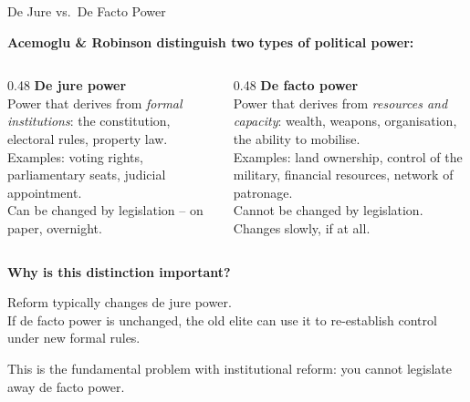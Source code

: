 \documentclass[10pt]{beamer}
\begin{document}
\begin{frame}[allowframebreaks]{De Jure vs.\ De Facto Power}

\textbf{Acemoglu \& Robinson distinguish two types of political power:}


\begin{columns}[T]
\begin{column}{0.48\textwidth}
\textbf{\color{myTeal} De jure power}\\[6pt]
Power that derives from \emph{formal institutions}: the constitution, electoral rules, property law.\\[4pt]
\footnotesize
Examples: voting rights, parliamentary seats, judicial appointment.\\[4pt]
Can be changed by legislation -- on paper, overnight.
\end{column}
\begin{column}{0.48\textwidth}
\textbf{\color{myOrange} De facto power}\\[6pt]
Power that derives from \emph{resources and capacity}: wealth, weapons, organisation, the ability to mobilise.\\[4pt]
\footnotesize
Examples: land ownership, control of the military, financial resources, network of patronage.\\[4pt]
Cannot be changed by legislation. Changes slowly, if at all.
\end{column}
\end{columns}


\textbf{Why is this distinction important?}

Reform typically changes de jure power.\\
If de facto power is unchanged, the old elite can use it to re-establish control under new formal rules.


\alert{This is the fundamental problem with institutional reform: you cannot legislate away de facto power.}
\end{frame}
\end{document}
